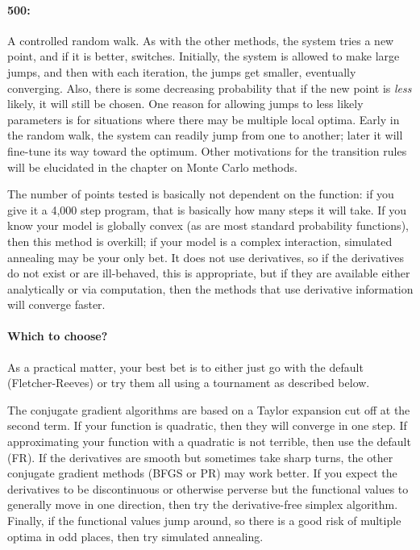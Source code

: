 \paragraph{500: } A controlled random walk.
As with the other methods, the system tries a new point, and if it
is better, switches. Initially, the system is allowed to make large
jumps, and then with each iteration, the jumps get smaller, eventually
converging. Also, there is some decreasing probability that if the new
point is {\em less} likely, it will still be chosen. One reason for
allowing jumps to less likely parameters is for
situations where there may be multiple local optima. Early
in the random walk, the system can readily jump from one to another;
later it will fine-tune its way toward the optimum. Other motivations
for the transition rules will be elucidated in the chapter on Monte
Carlo methods.

The number of points tested is basically not dependent on the function:
if you give it a 4,000 step program, that is basically how many steps
it will take.  If you know your model is globally convex (as are most
standard probability functions), then this method is overkill; if your
model is a complex interaction, simulated annealing may be your only
bet. It does not use derivatives, so if the derivatives do not exist or
are ill-behaved, this is appropriate, but if they are available either
analytically or via computation, then the methods that use derivative
information will converge faster.

\paragraph{Which to choose?}
As a practical matter, your best bet is to either just go with the default
(Fletcher-Reeves) or try them all using a tournament as described below.

The conjugate gradient algorithms are based on a Taylor expansion cut
off at the second term. If your function is quadratic, then they will
converge in one step.  
If approximating your function with a quadratic is not terrible, then
use the default (FR). If the derivatives are smooth but sometimes take sharp
turns, the other conjugate gradient methods (BFGS or PR) may work
better. If you expect the derivatives to be discontinuous or otherwise
perverse  but the functional
values to generally move in one direction, then 
try the derivative-free simplex algorithm. Finally, if the functional
values jump around, so there is a good risk of multiple
optima in odd places, then try simulated annealing.

